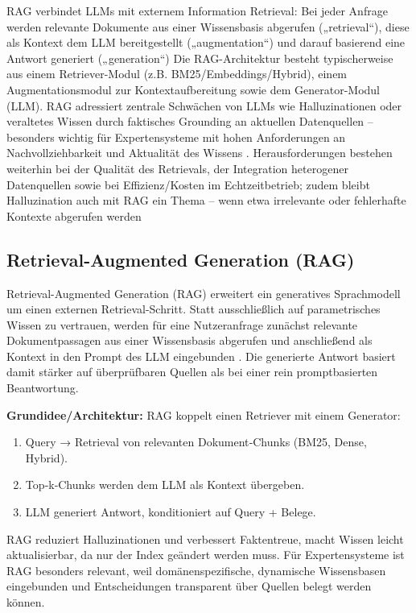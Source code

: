 RAG verbindet LLMs mit externem Information Retrieval: Bei jeder Anfrage werden relevante Dokumente aus einer Wissensbasis abgerufen („retrieval“), diese als Kontext dem LLM bereitgestellt („augmentation“) und darauf basierend eine Antwort generiert („generation“) \cite{Sharma2025} \cite{Sharma2026A}
 \cite{Zhang2023Sirens}
Die RAG-Architektur besteht typischerweise aus einem Retriever-Modul (z.B. BM25/Embeddings/Hybrid), einem Augmentationsmodul zur Kontextaufbereitung sowie dem Generator-Modul (LLM). RAG adressiert zentrale Schwächen von LLMs wie Halluzinationen oder veraltetes Wissen durch faktisches Grounding an aktuellen Datenquellen – besonders wichtig für Expertensysteme mit hohen Anforderungen an Nachvollziehbarkeit und Aktualität des Wissens \cite{Sharma2025} \cite{Sharma2026A}.
Herausforderungen bestehen weiterhin bei der Qualität des Retrievals, der Integration heterogener Datenquellen sowie bei Effizienz/Kosten im Echtzeitbetrieb; zudem bleibt Halluzination auch mit RAG ein Thema – wenn etwa irrelevante oder fehlerhafte Kontexte abgerufen werden \cite{Sharma2025} \cite{Sharma2026A} \cite{Zhang2023Sirens}

\subsection{Retrieval-Augmented Generation (RAG)}

Retrieval-Augmented Generation (RAG) erweitert ein generatives Sprachmodell um einen externen Retrieval-Schritt. Statt ausschließlich auf parametrisches Wissen zu vertrauen, werden für eine Nutzeranfrage zunächst relevante Dokumentpassagen aus einer Wissensbasis abgerufen und anschließend als Kontext in den Prompt des LLM eingebunden \cite{Sharma2025,Brown2025A,Oche2025}. Die generierte Antwort basiert damit stärker auf überprüfbaren Quellen als bei einer rein promptbasierten Beantwortung.

\textbf{Grundidee/Architektur:}
RAG koppelt einen Retriever mit einem Generator:
\begin{enumerate}
    \item Query → Retrieval von relevanten Dokument‑Chunks (BM25, Dense, Hybrid).
    \item Top‑k‑Chunks werden dem LLM als Kontext übergeben.
    \item LLM generiert Antwort, konditioniert auf Query + Belege.
\end{enumerate}
RAG reduziert Halluzinationen und verbessert Faktentreue, macht Wissen leicht aktualisierbar, da nur der Index geändert werden muss.\cite{Oche2025} \cite{Brown2025A}
Für Expertensysteme ist RAG besonders relevant, weil domänenspezifische, dynamische Wissensbasen eingebunden und Entscheidungen transparent über Quellen belegt werden können.\cite{Oche2025} \cite{Sharma2025}
\clearpage